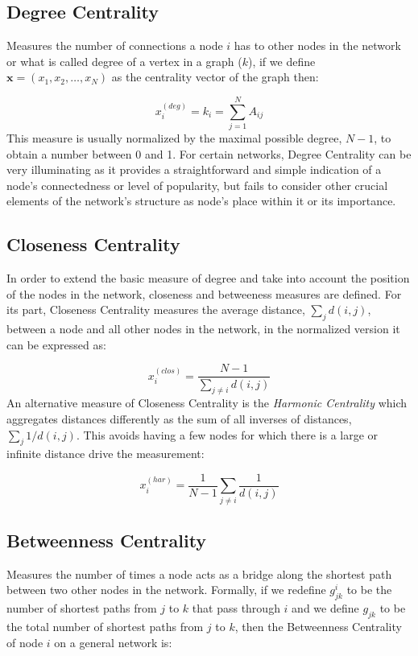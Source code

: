 \subsection*{Degree Centrality} Measures the number of connections a node $i$ has to other nodes in the network or what is called degree of a vertex in a graph ($k$), if we define $\mathbf{x}=(x_1,x_2,\dots,x_N)$ as the centrality vector of the graph then: 

\begin{equation}
    x_i^{(deg)}=k_i=\sum_{j=1}^{N}A_{ij}
\end{equation}
This measure is usually normalized by the maximal possible degree, $N − 1$, to obtain a number between 0 and 1. For certain networks, Degree Centrality can be very illuminating as it provides a straightforward and simple indication of a node's connectedness or level of popularity, but fails to consider other crucial elements of the network's structure as node's place within it or its importance.

\subsection*{Closeness Centrality} In order to extend the basic measure of degree and take into account the position of the nodes in the network, closeness and betweeness measures are defined. For its part, Closeness Centrality measures the average distance, $\sum_{j}^{}d(i,j)$, between a node and all other nodes in the network, in the normalized version it can be expressed as:

\begin{equation}
    x_i^{(clos)}= \frac{N-1}{\sum_{j\ne i}^{}d(i,j)}
\end{equation}
An alternative measure of Closeness Centrality is the \textit{Harmonic Centrality} which aggregates distances differently as the sum of all inverses
of distances, $\sum_{j}^{}1/d(i,j)$. This avoids having a few nodes for which there is a large or infinite distance drive the measurement:

\begin{equation}
    x_i^{(har)}= \frac{1}{N-1}\sum_{j\ne i}^{}\frac{1}{d(i,j)}
\end{equation}

\subsection*{Betweenness Centrality} Measures the number of times a node acts as a bridge along the shortest path between two other nodes in the network. Formally, if we redefine $g_{jk}^i$ to be the number of shortest paths from $j$ to $k$ that pass through $i$ and we define $g_{jk}$ to be the total number of shortest paths from $j$ to $k$, then the Betweenness Centrality of node $i$ on a general network is:

